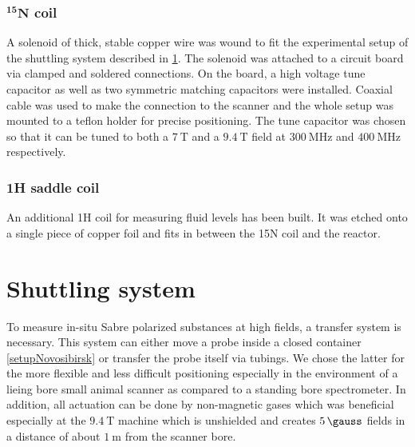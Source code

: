             \subsubsection{$\mathbf{^{15} N}$ coil}
                A solenoid of thick, stable copper wire was wound to fit the experimental setup of the shuttling system described in \ref{sec:shuttlingSystem}. The solenoid was attached to a circuit board via clamped and soldered connections. On the board, a high voltage tune capacitor as well as two symmetric matching capacitors were installed. Coaxial cable was used to make the connection to the scanner and the whole setup was mounted to a teflon holder for precise positioning.  The tune capacitor was chosen so that it can be tuned to both a $\SI{7}{\tesla}$ and a $\SI{9.4}{\tesla}$ field at $\SI{300}{\MHz}$ and $\SI{400}{\MHz}$ respectively.  
            \subsubsection{1H saddle coil} 
            An additional 1H coil for measuring fluid levels has been built. It was etched onto a single piece of copper foil and fits in between the 15N coil and the reactor.
    \section{Shuttling system}\label{sec:shuttlingSystem}
        To measure in-situ Sabre polarized substances at high fields, a transfer system is
        necessary. This system can either move a probe inside a closed container
        \ref{setupNovosibirsk} or transfer the probe itself via tubings. We chose the latter for the
        more flexible and less difficult positioning especially in the environment of a lieing bore
        small animal scanner as compared to a standing bore spectrometer. In addition, all actuation
        can be done by non-magnetic gases which was beneficial especially at the $\SI{9.4}{\tesla}$
        machine which is unshielded and creates $\SI{5}{\gauss}$ fields in a distance of about $\SI{1}{\meter}$ from
        the scanner bore.
